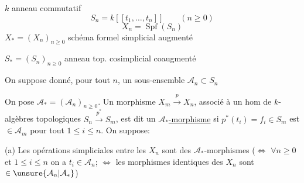 $k$ anneau commutatif
\[
S_n=k[[t_1,\ldots,t_n]]\qquad(n\ge0)
\]
\[
X_n=\operatorname{Spf}(S_n)
\]
$X_*=(X_n)_{n\ge0}$ schéma formel simplicial augmenté

$S_*=(S_n)_{n\ge0}$ anneau top. cosimplicial coaugmenté

On suppose donné, pour tout $n$, un sous-ensemble $\mathcal A_n\subset S_n$

On pose $\mathcal A_*=(\mathcal A_n)_{n\ge0}$. Un morphisme $X_m\xrightarrow{p}X_n$, associé à un hom de $k$-algèbres topologiques $S_n\xrightarrow{p^*}S_m$, est dit un \uline{$\mathcal A_*$-morphisme} si $p^*(t_i)=f_i\in S_m$ est $\in\mathcal A_m$ pour tout $1\le i\le n$.
On suppose:

(a) Les opérations simpliciales entre les $X_n$ sont des $\mathcal A_*$-morphismes ($\Longleftrightarrow$ $\forall n\ge0$ et $1\le i\le n$ on a $t_i\in\mathcal A_n$; $\Longleftrightarrow$ les morphismes identiques des $X_n$ sont $\in\unsure{\mathcal A_n|\mathcal A_*}$)


